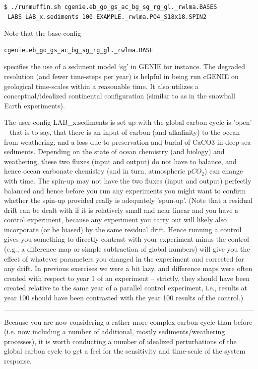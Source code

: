 \documentclass[11pt,fleqn]{book} %
\begin{document}
\begin{verbatim}
$ ./runmuffin.sh cgenie.eb_go_gs_ac_bg_sg_rg_gl._rwlma.BASES 
 LABS LAB_x.sediments 100 EXAMPLE._rwlma.PO4_S18x18.SPIN2 
\end{verbatim}

Note that the base-config
\begin{verbatim}
cgenie.eb_go_gs_ac_bg_sg_rg_gl._rwlma.BASE
\end{verbatim}
specifies the use of a sediment model ‘sg’ in GENIE for instance. 
The degraded resolution (and fewer time-steps per year) is helpful in being run cGENIE on geological time-scales within a reasonable time. It also utilizes a conceptual/idealized continental configuration (similar to as in the snowball Earth experiments).

The user-config LAB\_x.sediments is set up with the global carbon cycle is 'open' -- that is to say, that there is an input of carbon (and alkalinity) to the ocean from weathering, and a loss due to preservation and burial of CaCO3 in deep-sea sediments. Depending on the state of ocean chemistry (and biology) and weathering, these two fluxes (input and output) do not have to balance, and hence ocean carbonate chemistry (and in turn, atmospheric p\(CO_{2}\)) can change with time. The spin-up may not have the two fluxes (input and output) perfectly balanced and hence before you run any experiments you might want to confirm whether the spin-up provided really is adequately 'spun-up'.
(Note that a residual drift can be dealt with if it is relatively small and near linear and you have a control experiment, because any experiment you carry out will likely also incorporate (or be biased) by the same residual drift. Hence running a control gives you something to directly contrast with your experiment minus the control (e.g., a difference map or simple subtraction of global numbers) will give you the effect of whatever parameters you changed in the experiment and corrected for any drift. In previous exercises we were a bit lazy, and difference maps were often created with respect to year 1 of an experiment -- strictly, they should have been created relative to the same year of a parallel control experiment, i.e., results at year 100 should have been contrasted with the year 100 results of the control.)

\vspace{1mm}
\noindent\rule{4cm}{0.1mm}
\vspace{2mm}

Because you are now considering a rather more complex carbon cycle than before (i.e. now including a number of additional, mostly sediments/weathering processes), it is worth conducting a number of idealized perturbations of the global carbon cycle to get a feel for the sensitivity and time-scale of the system response.
\end{document}
